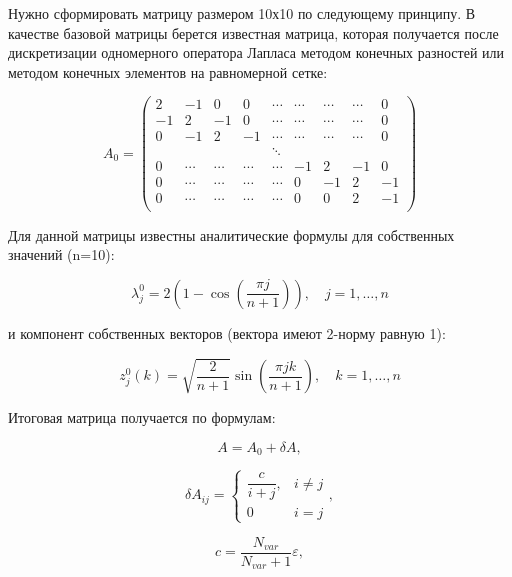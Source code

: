 \documentclass[a4paper]{article}
\begin{document}
Нужно сформировать матрицу размером 10х10 по следующему принципу. В качестве базовой матрицы берется известная матрица, которая получается после дискретизации одномерного оператора Лапласа методом конечных разностей или методом конечных элементов на равномерной сетке:

\begin{equation*}
A_0 = 
\begin{pmatrix}
2 & -1 & 0 & 0 & \cdots & \cdots & \cdots & \cdots & 0 \\
-1 & 2 & -1 & 0 & \cdots & \cdots & \cdots & \cdots & 0 \\
0 & -1 & 2 & -1 & \cdots & \cdots & \cdots & \cdots & 0 \\
 &  &  &  & \ddots &  &  &  &  \\
0 & \cdots & \cdots & \cdots & \cdots & -1 & 2 & -1 & 0 \\
0 & \cdots & \cdots & \cdots & \cdots & 0 & -1 & 2 & -1 \\
0 & \cdots & \cdots & \cdots & \cdots & 0 & 0 & 2 & -1 \\
\end{pmatrix}
\end{equation*}


Для данной матрицы известны аналитические формулы для собственных значений (n=10):

\begin{equation*}
\lambda^{0}_j = 2(1-\cos(\frac{\pi j}{n + 1})), \quad j = 1, \ldots, n
\end{equation*}

и компонент собственных векторов (вектора имеют 2-норму равную 1):

\begin{equation*}
z^{0}_j(k) = \sqrt{\frac{2}{n + 1}}\sin(\frac{\pi j k}{n + 1}), \quad k = 1, \ldots, n
\end{equation*}

Итоговая матрица получается по формулам:

\begin{equation*}
A = A_0 + \delta A,
\end{equation*}

\begin{equation*}
\delta A_{ij} = 
\left\{\begin{matrix}
\dfrac{c}{i + j}, & i \neq j \\ 
0 & i = j
\end{matrix}\right.,
\end{equation*}

\begin{equation*}
c = \frac{N_{var}}{N_{var} + 1}\varepsilon,
\end{equation*}
\end{document}
